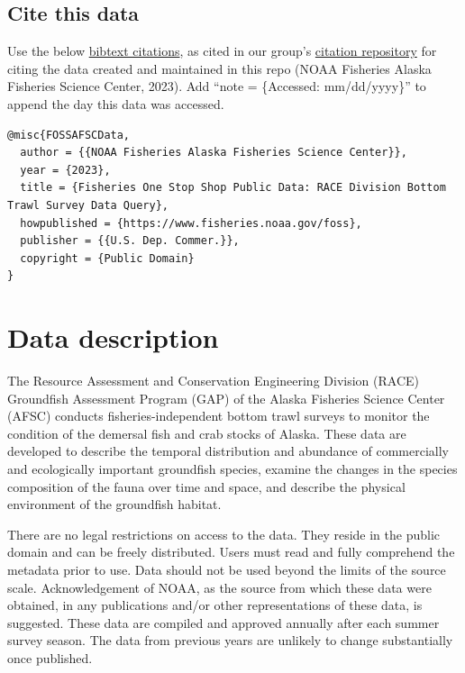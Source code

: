 \documentclass[
  letterpaper,
  oneside,
  open=any]{scrbook}
\begin{document}
\hypertarget{cite-this-data-2}{%
\section*{Cite this data}\label{cite-this-data-2}}


Use the below
\href{https://github.com/afsc-gap-products/gap_products/blob/main/code/CITATION_FOSSAFSCData.bib}{bibtext
citations}, as cited in our group's
\href{https://github.com/afsc-gap-products/citations/blob/main/cite/bibliography.bib}{citation
repository} for citing the data created and maintained in this repo
(NOAA Fisheries Alaska Fisheries Science Center, 2023). Add ``note =
\{Accessed: mm/dd/yyyy\}'' to append the day this data was accessed.

\begin{verbatim}
@misc{FOSSAFSCData,
  author = {{NOAA Fisheries Alaska Fisheries Science Center}},
  year = {2023}, 
  title = {Fisheries One Stop Shop Public Data: RACE Division Bottom Trawl Survey Data Query},
  howpublished = {https://www.fisheries.noaa.gov/foss},
  publisher = {{U.S. Dep. Commer.}},
  copyright = {Public Domain} 
}
\end{verbatim}

\hypertarget{data-description-4}{%
\chapter{Data description}\label{data-description-4}}

The Resource Assessment and Conservation Engineering Division (RACE)
Groundfish Assessment Program (GAP) of the Alaska Fisheries Science
Center (AFSC) conducts fisheries-independent bottom trawl surveys to
monitor the condition of the demersal fish and crab stocks of Alaska.
These data are developed to describe the temporal distribution and
abundance of commercially and ecologically important groundfish species,
examine the changes in the species composition of the fauna over time
and space, and describe the physical environment of the groundfish
habitat.

There are no legal restrictions on access to the data. They reside in
the public domain and can be freely distributed. Users must read and
fully comprehend the metadata prior to use. Data should not be used
beyond the limits of the source scale. Acknowledgement of NOAA, as the
source from which these data were obtained, in any publications and/or
other representations of these data, is suggested. These data are
compiled and approved annually after each summer survey season. The data
from previous years are unlikely to change substantially once published.
\end{document}
